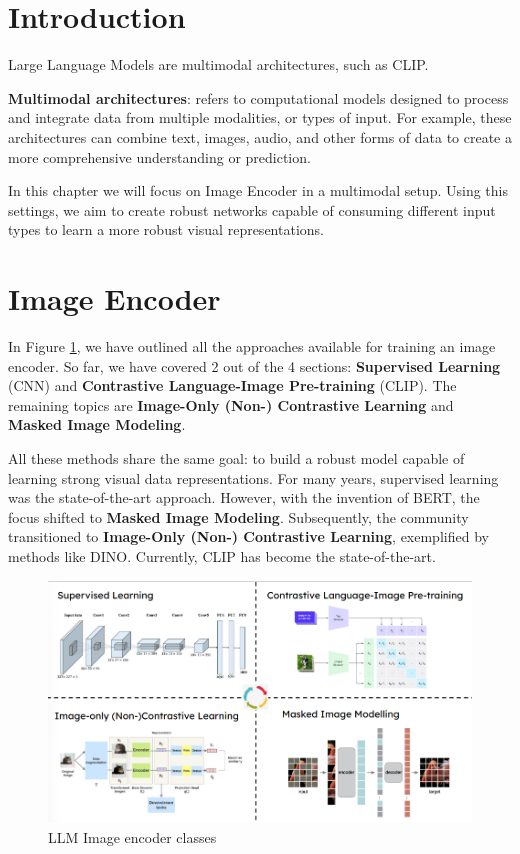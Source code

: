 \section{Introduction}
Large Language Models are multimodal architectures, such as CLIP.

\textbf{Multimodal architectures}: refers to computational models designed to process and integrate data from multiple modalities, or types of input. For example, these architectures can combine text, images, audio, and other forms of data to create a more comprehensive understanding or prediction.   


In this chapter we will focus on Image Encoder in a multimodal setup. Using this settings, we aim to create robust networks capable of consuming different input types to learn a more robust visual representations. 


\section{Image Encoder}

In Figure \ref{fig:LLM-Image-encoder}, we have outlined all the approaches available for training an image encoder. So far, we have covered 2 out of the 4 sections: \textbf{Supervised Learning} (CNN) and \textbf{Contrastive Language-Image Pre-training} (CLIP). The remaining topics are \textbf{Image-Only (Non-) Contrastive Learning} and \textbf{Masked Image Modeling}.

All these methods share the same goal: to build a robust model capable of learning strong visual data representations. For many years, supervised learning was the state-of-the-art approach. However, with the invention of BERT, the focus shifted to \textbf{Masked Image Modeling}. Subsequently, the community transitioned to \textbf{Image-Only (Non-) Contrastive Learning}, exemplified by methods like DINO. Currently, CLIP has become the state-of-the-art.

\begin{figure}[H]
    \centering
    \includegraphics[width=1\linewidth]{tikz/LLM Image Encoder.png}
    \caption{LLM Image encoder classes}
    \label{fig:LLM-Image-encoder}
\end{figure}

